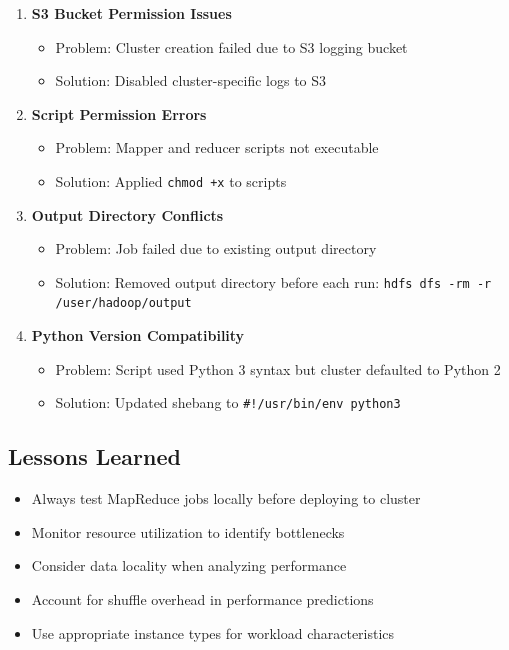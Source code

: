 \documentclass[11pt,a4paper]{article}
\begin{document}
\begin{enumerate}
    \item \textbf{S3 Bucket Permission Issues}
    \begin{itemize}
        \item Problem: Cluster creation failed due to S3 logging bucket
        \item Solution: Disabled cluster-specific logs to S3
    \end{itemize}
    
    \item \textbf{Script Permission Errors}
    \begin{itemize}
        \item Problem: Mapper and reducer scripts not executable
        \item Solution: Applied \texttt{chmod +x} to scripts
    \end{itemize}
    
    \item \textbf{Output Directory Conflicts}
    \begin{itemize}
        \item Problem: Job failed due to existing output directory
        \item Solution: Removed output directory before each run: \texttt{hdfs dfs -rm -r /user/hadoop/output}
    \end{itemize}
    
    \item \textbf{Python Version Compatibility}
    \begin{itemize}
        \item Problem: Script used Python 3 syntax but cluster defaulted to Python 2
        \item Solution: Updated shebang to \texttt{\#!/usr/bin/env python3}
    \end{itemize}
\end{enumerate}

\subsection{Lessons Learned}

\begin{itemize}
    \item Always test MapReduce jobs locally before deploying to cluster
    \item Monitor resource utilization to identify bottlenecks
    \item Consider data locality when analyzing performance
    \item Account for shuffle overhead in performance predictions
    \item Use appropriate instance types for workload characteristics
\end{itemize}
\end{document}
